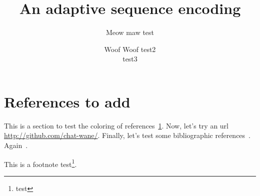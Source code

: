 \documentclass{class-for-drafts}
\title{An adaptive sequence encoding}
\author{Meow maw \aff test \and Woof Woof \aff test2 \\ test3}
\begin{document}
\maketitle

\section{References to add}
\label{sec:reference_test}

This is a section to test the coloring of
references~\ref{sec:reference_test}. Now, let's try an url
\url{http://github.com/chat-wane/}. Finally, let's test some bibliographic
references~\cite{nedelec2013lseq}. Again~\cite{nedelec2016crate,nedelec2015spray}.

This is a footnote test\footnote{test}.

\blinddocument

%

\end{document}
